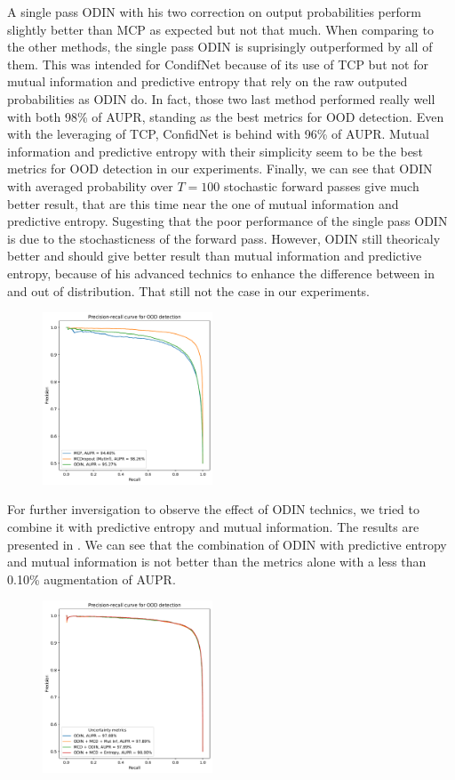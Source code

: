 A single pass ODIN with his two correction on output probabilities perform slightly better than MCP as expected but not that much. When comparing to the other methods, the single pass ODIN is suprisingly outperformed by all of them. This was intended for CondifNet because of its use of TCP but not for mutual information and predictive entropy that rely on the raw outputed probabilities as ODIN do. In fact, those two last method performed really well with both 98\% of AUPR, standing as the best metrics for OOD detection. 
Even with the leveraging of TCP, ConfidNet is behind with 96\% of AUPR. Mutual information and predictive entropy with their simplicity seem to be the best metrics for OOD detection in our experiments. 
Finally, we can see that ODIN with averaged probability over $ T=100 $ stochastic forward passes give much better result, that are this time near the one of mutual information and predictive entropy. Sugesting that the poor performance of the single pass ODIN is due to the stochasticness of the forward pass. However, ODIN still theoricaly better and should give better result than mutual information and predictive entropy, because of his advanced technics to enhance the difference between in and out of distribution. That still not the case in our experiments.
\begin{figure}[H]
    \centering
    \includegraphics[width=0.45\textwidth]{OOD_aupr.pdf}
    \caption{}
    \label{fig:OOD_aupr}
\end{figure}

For further inversigation to observe the effect of ODIN technics, we tried to combine it with predictive entropy and mutual information. The results are presented in . We can see that the combination of ODIN with predictive entropy and mutual information is not better than the metrics alone with a less than 0.10\% augmentation of AUPR. 
\begin{figure}[H]
    \centering
    \includegraphics[width=0.45\textwidth]{OOD_aupr_combo.pdf}
    \caption{}
    \label{fig:OOD_aupr_combo}
\end{figure}

